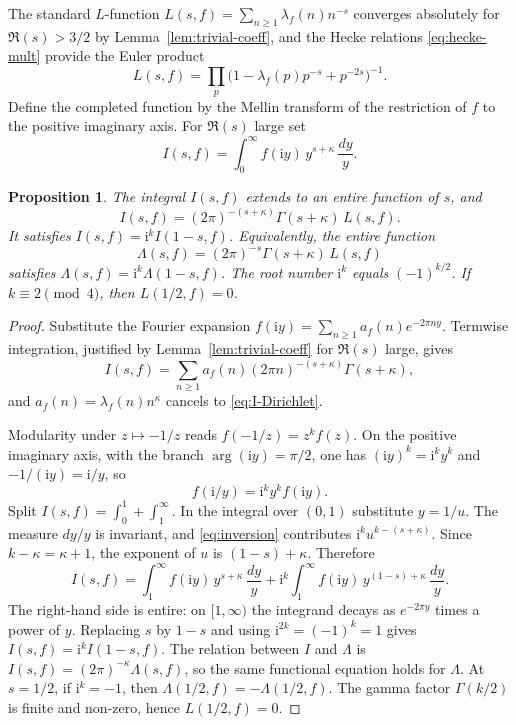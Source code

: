\documentclass[11pt]{amsart}
\newtheorem{proposition}[theorem]{Proposition}
\theoremstyle{definition}
\theoremstyle{remark}
\numberwithin{equation}{section}
\newcommand{\ii}{\mathrm{i}}
\begin{document}
The standard $L$-function $L(s,f)=\sum_{n\ge 1}\lambda_f(n)n^{-s}$ converges absolutely for $\Re(s)>3/2$ by Lemma~\ref{lem:trivial-coeff}, and the Hecke relations \eqref{eq:hecke-mult} provide the Euler product
\[
L(s,f)=\prod_p\bigl(1-\lambda_f(p)p^{-s}+p^{-2s}\bigr)^{-1}.
\]
Define the completed function by the Mellin transform of the restriction of $f$ to the positive imaginary axis. For $\Re(s)$ large set
\begin{equation}\label{eq:mellin-I}
I(s,f)
=\int_0^\infty f(\ii y)\,y^{s+\kappa}\,\frac{dy}{y}.
\end{equation}

\begin{proposition}\label{prop:FE}
The integral $I(s,f)$ extends to an entire function of $s$, and
\begin{equation}\label{eq:I-Dirichlet}
I(s,f)=(2\pi)^{-(s+\kappa)}\Gamma(s+\kappa)\,L(s,f).
\end{equation}
It satisfies $I(s,f)=\ii^k I(1-s,f)$. Equivalently, the entire function
\begin{equation}\label{eq:Lambda}
\Lambda(s,f)=(2\pi)^{-s}\Gamma(s+\kappa)\,L(s,f)
\end{equation}
satisfies $\Lambda(s,f)=\ii^k\Lambda(1-s,f)$. The root number $\ii^k$ equals $(-1)^{k/2}$. If $k\equiv 2\pmod 4$, then $L(1/2,f)=0$.
\end{proposition}

\begin{proof}
Substitute the Fourier expansion $f(\ii y)=\sum_{n\ge 1}a_f(n)e^{-2\pi n y}$. Termwise integration, justified by Lemma~\ref{lem:trivial-coeff} for $\Re(s)$ large, gives
\[
I(s,f)
=\sum_{n\ge 1}a_f(n)(2\pi n)^{-(s+\kappa)}\Gamma(s+\kappa),
\]
and $a_f(n)=\lambda_f(n)n^\kappa$ cancels to \eqref{eq:I-Dirichlet}.

Modularity under $z\mapsto -1/z$ reads $f(-1/z)=z^k f(z)$. On the positive imaginary axis, with the branch $\arg(\ii y)=\pi/2$, one has $(\ii y)^k=\ii^k y^k$ and $-1/(\ii y)=\ii/y$, so
\begin{equation}\label{eq:inversion}
f(\ii/y)=\ii^k y^k f(\ii y).
\end{equation}
Split $I(s,f)=\int_0^1+\int_1^\infty$. In the integral over $(0,1)$ substitute $y=1/u$. The measure $dy/y$ is invariant, and \eqref{eq:inversion} contributes $\ii^k u^{k-(s+\kappa)}$. Since $k-\kappa=\kappa+1$, the exponent of $u$ is $(1-s)+\kappa$. Therefore
\begin{equation}\label{eq:I-split}
I(s,f)
=\int_1^\infty f(\ii y)\,y^{s+\kappa}\,\frac{dy}{y}
+\ii^k\int_1^\infty f(\ii y)\,y^{(1-s)+\kappa}\,\frac{dy}{y}.
\end{equation}
The right-hand side is entire: on $[1,\infty)$ the integrand decays as $e^{-2\pi y}$ times a power of $y$. Replacing $s$ by $1-s$ and using $\ii^{2k}=(-1)^k=1$ gives $I(s,f)=\ii^k I(1-s,f)$. The relation between $I$ and $\Lambda$ is $I(s,f)=(2\pi)^{-\kappa}\Lambda(s,f)$, so the same functional equation holds for $\Lambda$. At $s=1/2$, if $\ii^k=-1$, then $\Lambda(1/2,f)=-\Lambda(1/2,f)$. The gamma factor $\Gamma(k/2)$ is finite and non-zero, hence $L(1/2,f)=0$.
\end{proof}
\end{document}
